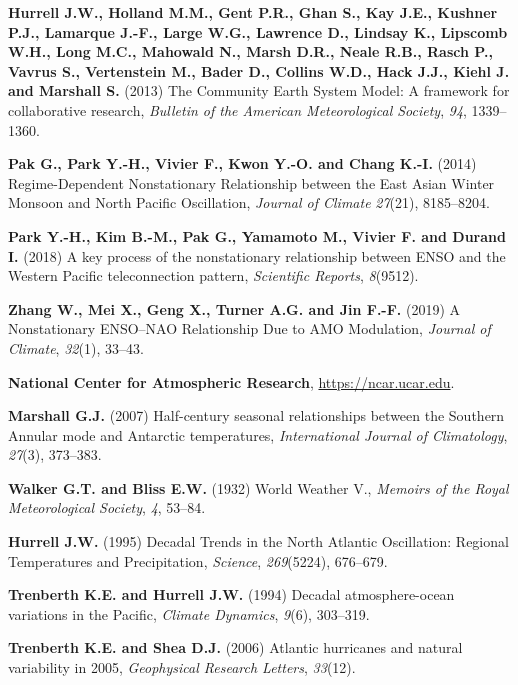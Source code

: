 \documentclass{CUP-JNL-DTM}%
\theoremstyle{definition}
\numberwithin{equation}{section}
\begin{document}
\begin{Backmatter}
\begin{thebibliography}{}
\textbf{Hurrell J.W., Holland M.M., Gent P.R., Ghan S., Kay J.E., Kushner P.J., Lamarque J.-F., Large W.G., Lawrence D., Lindsay K., Lipscomb W.H., Long M.C., Mahowald N., Marsh D.R., Neale R.B., Rasch P., Vavrus S., Vertenstein M., Bader D., Collins W.D., Hack J.J., Kiehl J. and Marshall S.} (2013) The Community Earth System Model: A framework for collaborative research, \textit{Bulletin of the American Meteorological Society}, \textit{94}, {1339}--{1360}.

\textbf{Pak G., Park Y.-H., Vivier F., Kwon Y.-O. and Chang K.-I.} (2014) Regime-Dependent Nonstationary Relationship between the East Asian Winter Monsoon and North Pacific Oscillation, \textit{Journal of Climate} \textit{27}(21), {8185}--{8204}.

\textbf{Park Y.-H., Kim B.-M., Pak G., Yamamoto M., Vivier F. and Durand I.} (2018) A key process of the nonstationary relationship between ENSO and the Western Pacific teleconnection pattern,  \textit{Scientific Reports}, \textit{8}(9512).

\textbf{Zhang W., Mei X., Geng X., Turner A.G. and Jin F.-F.} (2019) A Nonstationary ENSO–NAO Relationship Due to AMO Modulation, \textit{Journal of Climate}, \textit{32}(1), {33}--{43}.

\textbf{National Center for Atmospheric Research}, \url{https://ncar.ucar.edu}.

\textbf{Marshall G.J.} (2007) Half-century seasonal relationships between the Southern Annular mode and Antarctic temperatures, \textit{International Journal of Climatology}, \textit{27}(3), {373}--{383}.

\textbf{Walker G.T. and Bliss E.W.} (1932) World Weather V., \textit{Memoirs of the Royal Meteorological Society}, \textit{4}, {53}--{84}.

\textbf{Hurrell J.W.} (1995) Decadal Trends in the North Atlantic Oscillation: Regional Temperatures and Precipitation, \textit{Science}, \textit{269}(5224), {676}--{679}.

\textbf{Trenberth K.E. and Hurrell J.W.} (1994) Decadal atmosphere-ocean variations in the Pacific, \textit{Climate Dynamics}, \textit{9}(6), {303}--{319}.

\textbf{Trenberth K.E. and Shea D.J.} (2006) Atlantic hurricanes and natural variability in 2005, \textit{Geophysical Research Letters}, \textit{33}(12).


\end{thebibliography}
\end{Backmatter}
\end{document}
